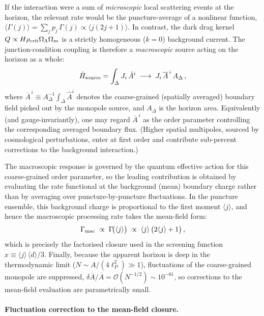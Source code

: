 \documentclass[aps,prd,twocolumn,10pt,superscriptaddress,nofootinbib]{revtex4-2}
\begin{document}
If the interaction were a sum of \emph{microscopic} local
scattering events at the horizon, the relevant rate would be the
puncture-average of a nonlinear function,
$\langle \Gamma(j) \rangle = \sum_j p_j\,\Gamma(j) \propto
\langle j(2j+1) \rangle$.  In contrast, the dark drag kernel
$Q \propto H\rho_{\rm crit}\Omega_\Lambda\Omega_m$ is a strictly
homogeneous ($k = 0$) background current.  The junction-condition
coupling is therefore a \emph{macroscopic} source acting on the
horizon as a whole:
\begin{equation}
\hat{H}_{\rm source}
  = \int_\Delta J_i\,\hat{A}^i
  \;\longrightarrow\;
  J_i\,\overline{A}^{\,i}\,A_\Delta\,,
\label{eq:source_zero_mode}
\end{equation}
where
$\overline{A}^{\,i} \equiv A_\Delta^{-1}\int_\Delta \hat{A}^i$
denotes the coarse-grained (spatially averaged) boundary field
picked out by the monopole source, and $A_\Delta$ is the horizon
area.  Equivalently (and gauge-invariantly), one may regard
$\overline{A}^{\,i}$ as the order parameter controlling the
corresponding averaged boundary flux.  (Higher spatial multipoles,
sourced by cosmological perturbations, enter at first order and
contribute sub-percent corrections to the background interaction.)

The macroscopic response is governed by the quantum effective
action for this coarse-grained order parameter, so the leading
contribution is obtained by evaluating the rate functional at the
background (mean) boundary charge rather than by averaging over
puncture-by-puncture fluctuations.  In the puncture ensemble, this
background charge is proportional to the first moment
$\langle j \rangle$, and hence the macroscopic processing rate
takes the mean-field form:
\begin{equation}
\Gamma_{\rm mac}
  \;\propto\; \Gamma\!\bigl(\langle j \rangle\bigr)
  \;\propto\; \langle j \rangle\,
    \bigl(2\langle j \rangle + 1\bigr)\,,
\label{eq:Gamma_mean_field}
\end{equation}
which is precisely the factorised closure used in the screening
function $x \equiv \langle j \rangle\,\langle d \rangle/3$.
Finally, because the apparent horizon is deep in the thermodynamic
limit ($N \sim A/(4\ell_P^2) \gg 1$), fluctuations of the
coarse-grained monopole are suppressed,
$\delta\overline{A}/\overline{A} = \mathcal{O}(N^{-1/2})
\sim 10^{-61}$, so corrections to the mean-field evaluation are
parametrically small.

\paragraph{Fluctuation correction to the mean-field closure.}
\end{document}
